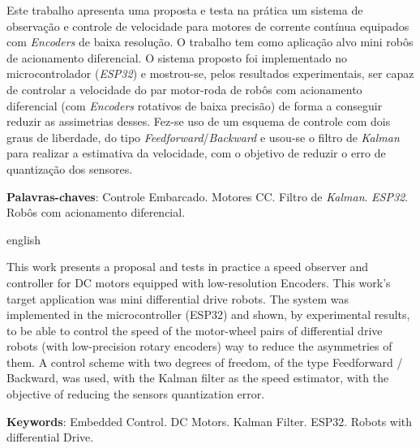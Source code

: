 \setlength{\absparsep}{18pt} %
\begin{resumo}

Este trabalho apresenta uma proposta e testa na prática um sistema de observação e controle de velocidade para motores de corrente contínua equipados com \emph{Encoders} de baixa resolução. O trabalho tem como aplicação alvo mini robôs de acionamento diferencial. O sistema proposto foi implementado no microcontrolador (\emph{ESP32}) e mostrou-se, pelos resultados experimentais, ser capaz de controlar a velocidade do par motor-roda de robôs com acionamento diferencial (com \emph{Encoders} rotativos de baixa precisão) de forma a conseguir reduzir as assimetrias desses. Fez-se uso de um esquema de controle com dois graus de liberdade, do tipo \emph{Feedforward}/\emph{Backward} e usou-se o filtro de \emph{Kalman} para realizar a estimativa da velocidade, com o objetivo de reduzir o erro de quantização dos sensores.

 
 \textbf{Palavras-chaves}: Controle Embarcado. Motores CC. Filtro de \emph{Kalman}. \emph{ESP32}. Robôs com acionamento diferencial.
\end{resumo}
\begin{resumo}[Abstract]
	\begin{otherlanguage*}{english}
	
		This work presents a proposal and tests in practice a speed observer and controller for DC motors equipped with low-resolution Encoders. This work's target application was mini differential drive robots. The system was implemented in the microcontroller (ESP32) and shown, by experimental results, to be able to control the speed of the motor-wheel pairs of differential drive robots (with low-precision rotary encoders) way to reduce the asymmetries of them. A control scheme with two degrees of freedom, of the type Feedforward / Backward, was used, with the Kalman filter as the speed estimator, with the objective of reducing the sensors quantization error.
	
	\vspace{\onelineskip}
	\noindent 
	\textbf{Keywords}: Embedded Control. DC Motors. Kalman Filter. ESP32. Robots with differential Drive.
	\end{otherlanguage*}
\end{resumo}